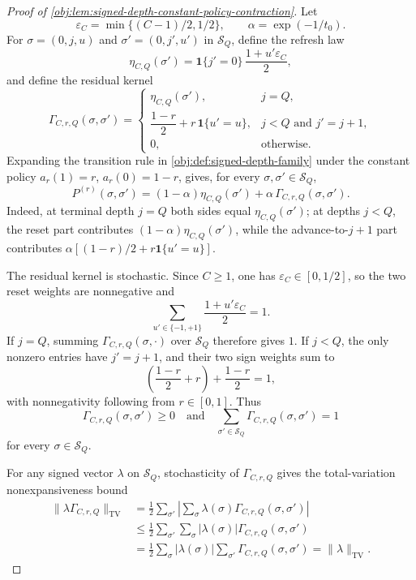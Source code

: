 \documentclass[11pt]{article}
\begin{document}
\begin{proof}[Proof of \cref{obj:lem:signed-depth-constant-policy-contraction}]
Let
\[
\varepsilon_C=\min\{(C-1)/2,1/2\},\qquad
\alpha=\exp(-1/t_0).
\]
For \(\sigma=(0,j,u)\) and \(\sigma'=(0,j',u')\) in \(\mathcal S_Q\), define the refresh law
\[
\eta_{C,Q}(\sigma')
=
\mathbf 1\{j'=0\}\,\frac{1+u'\varepsilon_C}{2},
\]
and define the residual kernel
\[
\Gamma_{C,r,Q}(\sigma,\sigma')
=
\begin{cases}
\eta_{C,Q}(\sigma'), & j=Q,\\[2mm]
\dfrac{1-r}{2}+r\,\mathbf 1\{u'=u\}, & j<Q \text{ and } j'=j+1,\\[2mm]
0, & \text{otherwise.}
\end{cases}
\]
Expanding the transition rule in \cref{obj:def:signed-depth-family} under the constant policy \(a_r(1)=r\), \(a_r(0)=1-r\), gives, for every \(\sigma,\sigma'\in\mathcal S_Q\),
\[
P^{(r)}(\sigma,\sigma')
=
(1-\alpha)\eta_{C,Q}(\sigma')
+
\alpha\,\Gamma_{C,r,Q}(\sigma,\sigma').
\]
Indeed, at terminal depth \(j=Q\) both sides equal \(\eta_{C,Q}(\sigma')\); at depths \(j<Q\), the reset part contributes \((1-\alpha)\eta_{C,Q}(\sigma')\), while the advance-to-\(j+1\) part contributes \(\alpha[(1-r)/2+r\mathbf 1\{u'=u\}]\). %

The residual kernel is stochastic. Since \(C\ge1\), one has \(\varepsilon_C\in[0,1/2]\), so the two reset weights are nonnegative and
\[
\sum_{u'\in\{-1,+1\}}\frac{1+u'\varepsilon_C}{2}=1.
\]
If \(j=Q\), summing \(\Gamma_{C,r,Q}(\sigma,\cdot)\) over \(\mathcal S_Q\) therefore gives \(1\). If \(j<Q\), the only nonzero entries have \(j'=j+1\), and their two sign weights sum to
\[
\left(\frac{1-r}{2}+r\right)+\frac{1-r}{2}=1,
\]
with nonnegativity following from \(r\in[0,1]\). Thus
\[
\Gamma_{C,r,Q}(\sigma,\sigma')\ge0
\quad\text{and}\quad
\sum_{\sigma'\in\mathcal S_Q}\Gamma_{C,r,Q}(\sigma,\sigma')=1
\]
for every \(\sigma\in\mathcal S_Q\). %

For any signed vector \(\lambda\) on \(\mathcal S_Q\), stochasticity of \(\Gamma_{C,r,Q}\) gives the total-variation nonexpansiveness bound
\[
\begin{aligned}
\|\lambda\Gamma_{C,r,Q}\|_{\mathrm{TV}}
&=
\frac12\sum_{\sigma'}\left|
\sum_{\sigma}\lambda(\sigma)\Gamma_{C,r,Q}(\sigma,\sigma')
\right| \\
&\le
\frac12\sum_{\sigma'}\sum_{\sigma}
|\lambda(\sigma)|\Gamma_{C,r,Q}(\sigma,\sigma') \\
&=
\frac12\sum_{\sigma}|\lambda(\sigma)|
\sum_{\sigma'}\Gamma_{C,r,Q}(\sigma,\sigma')
=
\|\lambda\|_{\mathrm{TV}} .
\end{aligned}
\]


\end{proof}
\end{document}

